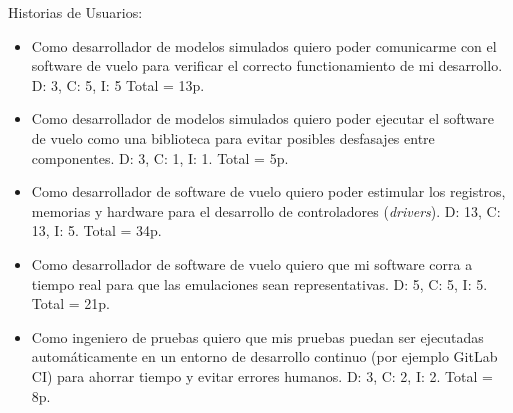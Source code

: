 Historias de Usuarios:

\begin{itemize}
\item Como desarrollador de modelos simulados quiero poder comunicarme con el software de vuelo para verificar el correcto functionamiento de mi desarrollo. D: 3, C: 5, I: 5 Total = 13p.

\item Como desarrollador de modelos simulados quiero poder ejecutar el software de vuelo como una biblioteca para evitar posibles desfasajes entre componentes. D: 3, C: 1, I: 1. Total = 5p.

\item Como desarrollador de software de vuelo quiero poder estimular los registros, memorias y hardware para el desarrollo de controladores (\textit{drivers}). D: 13, C: 13, I: 5. Total = 34p.

\item Como desarrollador de software de vuelo quiero que mi software corra a tiempo real para que las emulaciones sean representativas. D: 5, C: 5, I: 5. Total = 21p.

\item Como ingeniero de pruebas quiero que mis pruebas puedan ser ejecutadas automáticamente en un entorno de desarrollo continuo (por ejemplo GitLab CI) para ahorrar tiempo y evitar errores humanos. D: 3, C: 2, I: 2. Total = 8p.
\end{itemize}
